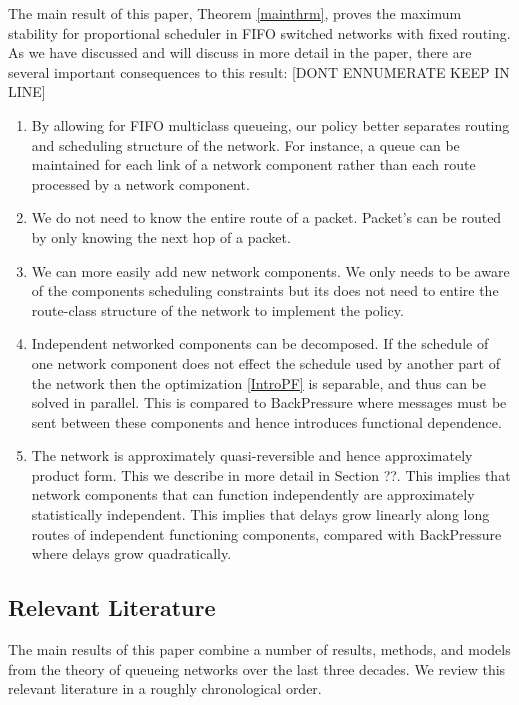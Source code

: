 \documentclass{amsart}
\begin{document}
The main result of this paper, Theorem \ref{mainthrm}, proves the maximum stability for proportional scheduler in FIFO switched networks with fixed routing. As we have discussed and will discuss in more detail in the paper, there are several important consequences to this result: [DONT ENNUMERATE KEEP IN LINE]
\begin{enumerate}
\item
By allowing for FIFO multiclass queueing, our policy better separates routing and scheduling structure of the network. For instance, a queue can be maintained for each link of a network component rather than each route processed by a network component. 

\item 
We do not need to know the entire route of a packet. Packet's can be routed by only knowing the next hop of a packet. 

\item 
We can more easily add new network components. We only needs to be aware of the components scheduling constraints but its does not need to entire the route-class structure of the network to implement the policy.

\item 
Independent networked components can be decomposed. If the schedule of one network component does not effect the schedule used by another part of the network then the optimization \eqref{IntroPF} is separable, and thus can be solved in parallel. This is compared to BackPressure where messages must be sent between these components and hence introduces functional dependence.

\item 
The network is approximately quasi-reversible and hence approximately product form. This we describe in more detail in Section ??. This implies that network components that can function independently are approximately statistically independent. This implies that delays grow linearly along long routes of independent functioning components, compared with BackPressure where delays grow quadratically.
\end{enumerate}

\fi

\subsection{Relevant Literature}
The main results of this paper combine a number of results, methods, and models from the theory of queueing networks over the last three decades. We review this relevant literature  in a roughly chronological order.
\end{document}
